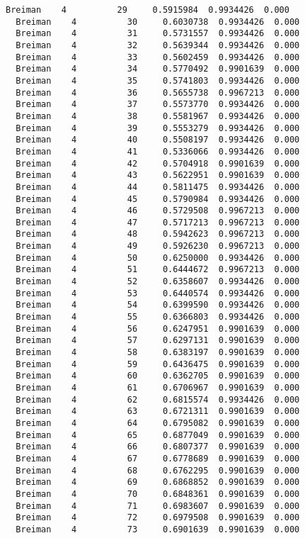 \documentclass[11pt]{article}
\begin{document}
\begin{Verbatim}[commandchars=\\\{\}]
  Breiman    4          29     0.5915984  0.9934426  0.000
  Breiman    4          30     0.6030738  0.9934426  0.000
  Breiman    4          31     0.5731557  0.9934426  0.000
  Breiman    4          32     0.5639344  0.9934426  0.000
  Breiman    4          33     0.5602459  0.9934426  0.000
  Breiman    4          34     0.5770492  0.9901639  0.000
  Breiman    4          35     0.5741803  0.9934426  0.000
  Breiman    4          36     0.5655738  0.9967213  0.000
  Breiman    4          37     0.5573770  0.9934426  0.000
  Breiman    4          38     0.5581967  0.9934426  0.000
  Breiman    4          39     0.5553279  0.9934426  0.000
  Breiman    4          40     0.5508197  0.9934426  0.000
  Breiman    4          41     0.5336066  0.9934426  0.000
  Breiman    4          42     0.5704918  0.9901639  0.000
  Breiman    4          43     0.5622951  0.9901639  0.000
  Breiman    4          44     0.5811475  0.9934426  0.000
  Breiman    4          45     0.5790984  0.9934426  0.000
  Breiman    4          46     0.5729508  0.9967213  0.000
  Breiman    4          47     0.5717213  0.9967213  0.000
  Breiman    4          48     0.5942623  0.9967213  0.000
  Breiman    4          49     0.5926230  0.9967213  0.000
  Breiman    4          50     0.6250000  0.9934426  0.000
  Breiman    4          51     0.6444672  0.9967213  0.000
  Breiman    4          52     0.6358607  0.9934426  0.000
  Breiman    4          53     0.6440574  0.9934426  0.000
  Breiman    4          54     0.6399590  0.9934426  0.000
  Breiman    4          55     0.6366803  0.9934426  0.000
  Breiman    4          56     0.6247951  0.9901639  0.000
  Breiman    4          57     0.6297131  0.9901639  0.000
  Breiman    4          58     0.6383197  0.9901639  0.000
  Breiman    4          59     0.6436475  0.9901639  0.000
  Breiman    4          60     0.6362705  0.9901639  0.000
  Breiman    4          61     0.6706967  0.9901639  0.000
  Breiman    4          62     0.6815574  0.9934426  0.000
  Breiman    4          63     0.6721311  0.9901639  0.000
  Breiman    4          64     0.6795082  0.9901639  0.000
  Breiman    4          65     0.6877049  0.9901639  0.000
  Breiman    4          66     0.6807377  0.9901639  0.000
  Breiman    4          67     0.6778689  0.9901639  0.000
  Breiman    4          68     0.6762295  0.9901639  0.000
  Breiman    4          69     0.6868852  0.9901639  0.000
  Breiman    4          70     0.6848361  0.9901639  0.000
  Breiman    4          71     0.6983607  0.9901639  0.000
  Breiman    4          72     0.6979508  0.9901639  0.000
  Breiman    4          73     0.6901639  0.9901639  0.000

\end{Verbatim}
\end{document}
